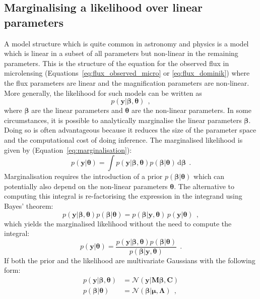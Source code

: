 \documentclass[12pt,dvipsnames]{report}
\newcommand{\ud}{\,\mathrm{d}}
\renewcommand{\vec}[1]{\boldsymbol{\mathbf{#1}}}
\newcommand{\hquad}{~~}
\begin{document}
\subsection{Marginalising a likelihood over linear parameters}
\label{ssec:marginalise_linear}
A model structure which is quite common in astronomy and physics is a model
which is linear in a subset of all parameters but non-linear in the remaining parameters.
 This is the structure of the equation for the observed flux in microlensing
(Equations~\ref{eq:flux_observed_micro} or \ref{eq:flux_dominik}) where the
flux parameters are linear and the magnification parameters are non-linear. 
More generally, the likelihood for such models can be written as
\begin{equation}
    p(\vec{y}\lvert \vec\beta, \vec{\theta})
    \hquad,
\end{equation}
where $\vec\beta$ are the linear parameters and $\vec{\theta}$ are the non-linear parameters.
In some circumstances, it is possible to analytically marginalise the linear
parameters $\vec\beta$. Doing so is often advantageous because it reduces the size of the
parameter space  and the computational cost of doing inference.
The marginalised likelihood is given by (Equation~\ref{eq:marginalisation}):
\begin{equation}
    p(\vec{y}\lvert \vec{\theta})=\int p(\vec{y}\lvert \vec\beta, \vec{\theta})p(\vec\beta\lvert \vec{\theta}) \ud\vec\beta
    \hquad.
\end{equation}
Marginalisation requires the introduction of a prior  $p(\vec\beta\lvert \vec{\theta})$
which can potentially also depend on the non-linear parameters $\vec{\theta}$.
The alternative to computing this integral is re-factorising the expression in the integrand
using Bayes' theorem:
\begin{equation}
    p(\vec{y}\lvert \vec\beta, \vec{\theta})p(\vec\beta\lvert \vec{\theta})  = p(\vec\beta\lvert \vec{y},\vec{\theta})\,p(\vec{y}\lvert \vec{\theta})
    \hquad,
\end{equation}
which yields the marginalised likelihood without the need to compute the integral:
\begin{equation}
    p(\vec{y}\lvert \vec{\theta}) = \frac{    p(\vec{y}\lvert \vec\beta, \vec{\theta})p(\vec\beta\lvert \vec{\theta})}{p(\vec\beta\lvert \vec{y},\vec{\theta})}
    \hquad.
    \label{eq:likelihood_factorisation}
\end{equation}
If both the prior and the likelihood are multivariate Gaussians with the following form:
\begin{align}
    p(\vec{y}\lvert \vec\beta, \vec{\theta}) & = \mathcal{N}(\vec{y}\lvert \vec{M}\vec\beta,\vec{C})  \\
    p(\vec\beta\lvert \vec{\theta})          & = \mathcal{N}(\vec\beta\lvert \vec{\mu},\vec{\Lambda})
    \hquad,
\end{align}
\end{document}
